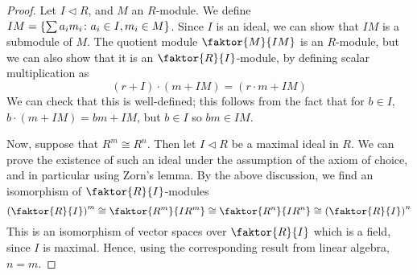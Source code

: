 \begin{proof}
	Let \( I \vartriangleleft R \), and \( M \) an \( R \)-module.
	We define \( IM = \qty{\sum a_i m_i \colon a_i \in I, m_i \in M} \).
	Since \( I \) is an ideal, we can show that \( IM \) is a submodule of \( M \).
	The quotient module \( \faktor{M}{IM} \) is an \( R \)-module, but we can also show that it is an \( \faktor{R}{I} \)-module, by defining scalar multiplication as
	\[
		(r+I) \cdot (m+IM) = (r \cdot m + IM)
	\]
	We can check that this is well-defined; this follows from the fact that for \( b \in I \), \( b \cdot (m + IM) = bm + IM \), but \( b \in I \) so \( bm \in IM \).

	Now, suppose that \( R^m \cong R^n \).
	Then let \( I \vartriangleleft R \) be a maximal ideal in \( R \).
	We can prove the existence of such an ideal under the assumption of the axiom of choice, and in particular using Zorn's lemma.
	By the above discussion, we find an isomorphism of \( \faktor{R}{I} \)-modules
	\[
		\qty(\faktor{R}{I})^m \cong \faktor{R^m}{IR^m} \cong \faktor{R^n}{IR^n} \cong \qty(\faktor{R}{I})^n
	\]
	This is an isomorphism of vector spaces over \( \faktor{R}{I} \) which is a field, since \( I \) is maximal.
	Hence, using the corresponding result from linear algebra, \( n = m \).
\end{proof}


